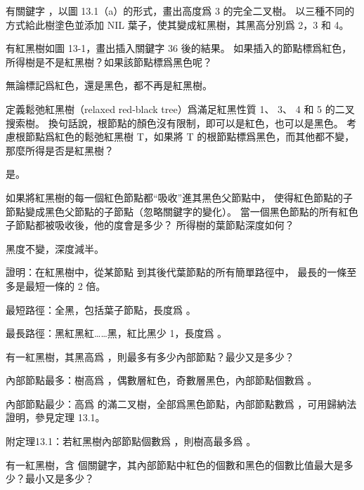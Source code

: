 \startsection[
  title={Properties of red-black trees},
]

\startEXERCISE
有關鍵字 ，以圖 13.1（a）的形式，畫出高度爲 3 的完全二叉樹。
以三種不同的方式給此樹塗色並添加 NIL 葉子，使其變成紅黑樹，其黑高分別爲 2，3 和 4。
\stopEXERCISE

\startANSWER
\externalfigure[output/e13_1_1-1]
\stopANSWER

\startEXERCISE
有紅黑樹如圖 13-1，畫出插入關鍵字 36 後的結果。
如果插入的節點標爲紅色，所得樹是不是紅黑樹？如果該節點標爲黑色呢？
\stopEXERCISE

\startANSWER
無論標記爲紅色，還是黑色，都不再是紅黑樹。
\stopANSWER

\startEXERCISE
定義{\EMP 鬆弛紅黑樹（relaxed red-black tree）}爲滿足紅黑性質 1、 3、 4 和 5 的二叉搜索樹。
換句話說，根節點的顏色沒有限制，即可以是紅色，也可以是黑色。
考慮根節點爲紅色的鬆弛紅黑樹 T，如果將 T 的根節點標爲黑色，而其他都不變，
那麼所得是否是紅黑樹？
\stopEXERCISE

\startANSWER
是。
\stopANSWER

\startEXERCISE
如果將紅黑樹的每一個紅色節點都“吸收”進其黑色父節點中，
使得紅色節點的子節點變成黑色父節點的子節點（忽略關鍵字的變化）。
當一個黑色節點的所有紅色子節點都被吸收後，他的度會是多少？
所得樹的葉節點深度如何？
\stopEXERCISE

\startANSWER
黑度不變，深度減半。
\stopANSWER

\startEXERCISE
證明：在紅黑樹中，從某節點  到其後代葉節點的所有簡單路徑中，
最長的一條至多是最短一條的 2 倍。
\stopEXERCISE

\startANSWER
最短路徑：全黑，包括葉子節點，長度爲 。

最長路徑：黑紅黑紅……黑，紅比黑少 1，長度爲 。
\stopANSWER

\startEXERCISE
有一紅黑樹，其黑高爲 ，則最多有多少內部節點？最少又是多少？
\stopEXERCISE

\startANSWER
內部節點最多：樹高爲 ，偶數層紅色，奇數層黑色，內部節點個數爲 。

內部節點最少：高爲  的滿二叉樹，全部爲黑色節點，內部節點數爲 ，可用歸納法證明，參見定理 13.1。

附定理13.1：若紅黑樹內部節點個數爲 ，則樹高最多爲 。
\stopANSWER

\startEXERCISE
有一紅黑樹，含  個關鍵字，其內部節點中紅色的個數和黑色的個數比值最大是多少？最小又是多少？
\stopEXERCISE

